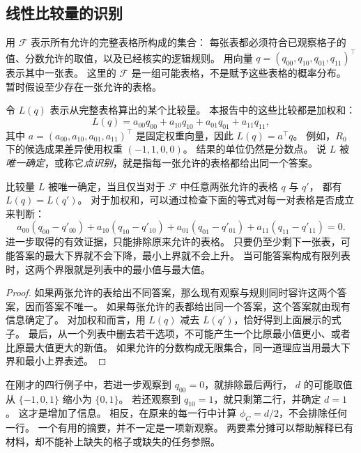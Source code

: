 \subsection{线性比较量的识别}
\label{subsec:linear-identification}

用 $\mathcal F$ 表示所有允许的完整表格所构成的集合：
每张表都必须符合已观察格子的值、分数允许的取值，以及已经核实的逻辑规则。
用向量 $q=(q_{00},q_{10},q_{01},q_{11})^{\top}$ 表示其中一张表。
这里的 $\mathcal F$ 是一组可能表格，不是赋予这些表格的概率分布。
暂时假设至少存在一张允许的表格。

令 $L(q)$ 表示从完整表格算出的某个比较量。
本报告中的这些比较都是加权和：
\[
L(q)=a_{00}q_{00}+a_{10}q_{10}+a_{01}q_{01}+a_{11}q_{11},
\]
其中 $a=(a_{00},a_{10},a_{01},a_{11})^{\top}$ 是固定权重向量，因此 $L(q)=a^{\top}q$。
例如，$R_0$ 下的候选成果差异使用权重 $(-1,1,0,0)$。
结果的单位仍然是分数点。
说 $L$ 被\emph{唯一确定}，或称它\emph{点识别}，就是指每一张允许的表格都给出同一个答案。

\begin{proposition}[已有信息何时能够唯一确定一个比较量]
\label{prop:completion}
比较量 $L$ 被唯一确定，当且仅当对于 $\mathcal F$ 中任意两张允许的表格 $q$ 与 $q'$，
都有 $L(q)=L(q')$。
对于加权和，可以通过检查下面的等式对每一对表格是否成立来判断：
\[
a_{00}(q_{00}-q'_{00})+a_{10}(q_{10}-q'_{10})
+a_{01}(q_{01}-q'_{01})+a_{11}(q_{11}-q'_{11})=0.
\]
进一步取得的有效证据，只能排除原来允许的表格。
只要仍至少剩下一张表，可能答案的最大下界就不会下降，最小上界就不会上升。
当可能答案构成有限列表时，这两个界限就是列表中的最小值与最大值。
\end{proposition}

\begin{proof}
如果两张允许的表给出不同答案，那么现有观察与规则同时容许这两个答案，因而答案不唯一。
如果每张允许的表都给出同一个答案，这个答案就由现有信息确定了。
对加权和而言，用 $L(q)$ 减去 $L(q')$，恰好得到上面展示的式子。
最后，从一个列表中删去若干选项，不可能产生一个比原最小值更小、或者比原最大值更大的新值。
如果允许的分数构成无限集合，同一道理应当用最大下界和最小上界表述。
\end{proof}

在刚才的四行例子中，若进一步观察到 $q_{00}=0$，就排除最后两行，
$d$ 的可能取值从 $\{-1,0,1\}$ 缩小为 $\{0,1\}$。
若还观察到 $q_{10}=1$，就只剩第二行，并确定 $d=1$。
这才是增加了信息。
相反，在原来的每一行中计算 $\phi_C=d/2$，不会排除任何一行。
一个有用的摘要，并不一定是一项新观察。
两要素分摊可以帮助解释已有材料，却不能补上缺失的格子或缺失的任务参照。

